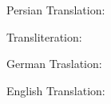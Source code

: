 \documentclass[twocolumn]{article}
\def\titlerule#1{\hrulefill  #1: \par}
\begin{document}
\begin{arab}[utf]
\qurantext\par
\titlerule{\beginL Persian Translation\endL}
\qurantextfa\par
\end{arab}
\newpage
\titlerule{Transliteration}
\qurantextlt\par
\titlerule{German Traslation}
\qurantextde\par
\titlerule{English Translation}
\qurantexten\par
\end{document}
